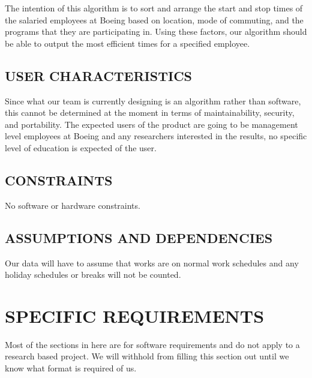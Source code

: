 \documentclass[twoside,letterpaper]{article}
\begin{document}
{{{{\color{black}
The intention of this algorithm is to sort and arrange the start and stop times of the salaried employees at Boeing based on location, mode of commuting, and the programs that they are participating in. Using these factors, our algorithm should be able to output the most efficient times for a specified employee.


\subsection[USER
CHARACTERISTICS]{\rmfamily\bfseries\color{black}
USER CHARACTERISTICS}



{\color{black}
Since what our team is currently designing is an algorithm rather than software, this cannot be determined at the moment in terms of maintainability, security, and portability.
The expected users of the product are going to be management level employees at Boeing and any researchers interested in the results, no specific level of education is expected of the user.


\subsection[CONSTRAINTS]{\rmfamily\bfseries\color{black}
CONSTRAINTS}


{\color{black}
No software or hardware constraints.


\subsection[ASSUMPTIONS AND
DEPENDENCIES]{\rmfamily\bfseries\color{black}
ASSUMPTIONS AND DEPENDENCIES}


{\color{black}
Our data will have to assume that works are on normal work schedules and any holiday schedules or breaks will not be counted.


\clearpage\section[SPECIFIC
REQUIREMENTS]{\rmfamily\bfseries\color{black}
SPECIFIC REQUIREMENTS}
{\color{black}
Most of the sections in here are for software requirements and do not apply to a research based project. We will withhold from filling this section out until we know what format is required of us.
}

}}}}}}}
\end{document}
